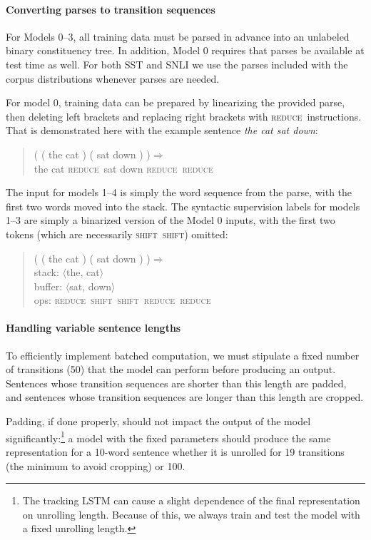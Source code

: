 \documentclass[11pt,letterpaper]{article}
\newcommand{\shift}{\textsc{shift}}
\newcommand{\reduce}{\textsc{reduce}}
\def\ii#1{\textit{#1}}
\begin{document}
\paragraph{Converting parses to transition sequences}

For Models 0--3, all training data must be parsed in advance into an unlabeled binary constituency tree. In addition, Model 0 requires that  parses be available at test time as well. For both SST and SNLI we use the parses included with the corpus distributions whenever parses are needed. 

For model 0, training data can be prepared by linearizing the provided parse, then deleting left brackets and replacing right brackets with \reduce~instructions. That is demonstrated here with the example sentence \ii{the cat sat down}:

\begin{quote}\small
( ( the cat ) ( sat down ) )$\Rightarrow$\\
the cat \reduce~sat down \reduce~\reduce
\end{quote}

The input for models 1--4 is simply the word sequence from the parse, with the first two words moved into the stack. The syntactic supervision labels for models 1--3 are simply a binarized version of the Model 0 inputs, with the first two tokens (which are necessarily \shift~\shift) omitted: 

\begin{quote}\small
( ( the cat ) ( sat down ) )$\Rightarrow$ \\
stack: $\langle$the, cat$\rangle$\\
buffer: $\langle$sat, down$\rangle$\\
ops: \reduce~\shift~\shift~\reduce~\reduce
\end{quote}

\paragraph{Handling variable sentence lengths}

To efficiently implement batched computation, we must stipulate a fixed number of transitions (50) that the model can perform before producing an output. Sentences whose transition sequences are shorter than this length are padded, and sentences whose transition sequences are longer than this length are cropped. 

Padding, if done properly, should not impact the output of the model significantly:\footnote{The tracking LSTM can cause a slight dependence of the final representation on unrolling length. Because of this, we always train and test the model with a fixed unrolling length.} a model with the fixed parameters should produce the same representation for a 10-word sentence whether it is unrolled for 19 transitions (the minimum to avoid cropping) or 100.
\end{document}
